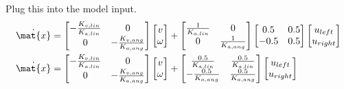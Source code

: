 Plug this into the model input.
\begin{align*}
  \dot{\mat{x}} &=
  \begin{bmatrix}
    -\frac{K_{v,lin}}{K_{a,lin}} & 0 \\
    0 & -\frac{K_{v,ang}}{K_{a,ang}}
  \end{bmatrix}
  \begin{bmatrix}
    v \\
    \omega
  \end{bmatrix} +
  \begin{bmatrix}
    \frac{1}{K_{a,lin}} & 0 \\
    0 & \frac{1}{K_{a,ang}}
  \end{bmatrix}
  \begin{bmatrix}
    0.5 & 0.5 \\
    -0.5 & 0.5
  \end{bmatrix}
  \begin{bmatrix}
    u_{left} \\
    u_{right}
  \end{bmatrix} \\
  \dot{\mat{x}} &=
  \begin{bmatrix}
    -\frac{K_{v,lin}}{K_{a,lin}} & 0 \\
    0 & -\frac{K_{v,ang}}{K_{a,ang}}
  \end{bmatrix}
  \begin{bmatrix}
    v \\
    \omega
  \end{bmatrix} +
  \begin{bmatrix}
    \frac{0.5}{K_{a,lin}} & \frac{0.5}{K_{a,lin}} \\
    -\frac{0.5}{K_{a,ang}} & \frac{0.5}{K_{a,ang}}
  \end{bmatrix}
  \begin{bmatrix}
    u_{left} \\
    u_{right}
  \end{bmatrix}
\end{align*}
